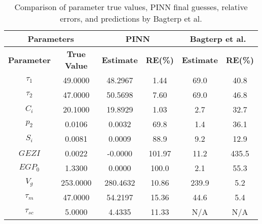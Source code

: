 \documentclass[11pt]{memoir}
\begin{document}
	 \begin{table}[h!]
	 	\centering
	 	\begin{tabular}{|c|c|c|c|c|c|}
	 		\hline
	 		\multicolumn{2}{|c|}{\textbf{Parameters}} & \multicolumn{2}{c|}{\textbf{PINN}} & \multicolumn{2}{c|}{\textbf{Bagterp et al.}} \\ \hline
	 		\textbf{Parameter} & \textbf{True Value} & \textbf{Estimate} & \textbf{RE(\%)} & \textbf{Estimate} & \textbf{RE(\%)} \\ \hline
	 	    $\tau_1$&  49.0000   &  48.2967   &  1.44    & 69.0     & 40.8     \\ \hline
	 		 $	\tau_2$   & 47.0000    &  50.5698   &  7.60    & 69.0     & 46.8     \\ \hline
	 	 	$C_i$   &  20.1000  &  19.8929  &  1.03   & 2.7      & 32.7     \\ \hline
	 	 $	p_2$    &  0.0106  &  0.0032  &  69.8    & 1.4      & 36.1     \\ \hline
	 	   $S_i $   &  0.0081   &   0.0009   &  88.9    & 9.2      & 12.9     \\ \hline
	 		$GEZI$    & 0.0022    & -0.0000   & 101.97   & 11.2     & 435.5    \\ \hline
	 		$EGP_0$    & 1.3300    & 0.0000    & 100.0    & 2.1      & 55.3     \\ \hline
	 		$V_g$      & 253.0000  & 280.4632  & 10.86    & 239.9    & 5.2      \\ \hline
	 		$\tau_m$    & 47.0000   & 54.2197   & 15.36    & 44.6     & 5.4      \\ \hline
	 		$\tau_{sc}$   & 5.0000    & 4.4335    & 11.33    & N/A        & N/A        \\ \hline
	 	\end{tabular}
	 	\caption{Comparison of parameter true values, PINN final guesses, relative errors, and predictions by Bagterp et al.}
	 	\label{tab:parameter_compariso43n}
	 \end{table}
	 
	 
	 
\end{document}
